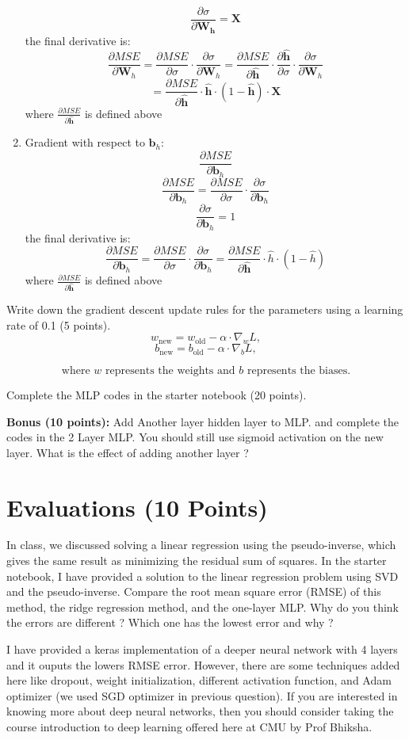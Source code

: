 \documentclass{article}
\begin{document}
\begin{enumerate}
    \[
    \frac{\partial \sigma}{\partial \mathbf{W_h}} = \mathbf{X}
    \]
    the final derivative is:
    \[
    \frac{\partial MSE}{\partial \mathbf{W}_h} = \frac{\partial MSE}{\partial \sigma} \cdot \frac{\partial \sigma}{\partial \mathbf{W}_h} = \frac{\partial MSE}{\partial \mathbf{\hat{h}}} \cdot \frac{\partial \mathbf{\hat{h}}}{\partial \sigma} \cdot \frac{\partial \sigma}{\partial \mathbf{W}_h}
    \]
    \[
    = \frac{\partial MSE}{\partial \mathbf{\hat{h}}} \cdot \mathbf{\hat{h}} \cdot (1 - \mathbf{\hat{h}}) \cdot \mathbf{X}
    \]
    where $\frac{\partial MSE}{\partial \mathbf{\hat{h}}}$ is defined above
    \item Gradient with respect to $\mathbf{b}_h$: $$\frac{\partial MSE}{\partial \mathbf{b}_h}$$
    \[
    \frac{\partial MSE}{\partial \mathbf{b}_h} = \frac{\partial MSE}{\partial \sigma} \cdot \frac{\partial \sigma}{\partial \mathbf{b}_h}
    \]
    \[
    \frac{\partial \sigma}{\partial \mathbf{b}_h} = 1 
    \]
    the final derivative is:
    \[
    \frac{\partial MSE}{\partial \mathbf{b}_h} = \frac{\partial MSE}{\partial \sigma} \cdot \frac{\partial \sigma}{\partial \mathbf{b}_h} = \frac{\partial MSE}{\partial \mathbf{\hat{h}}} \cdot \hat{h} \cdot (1 - \hat{h})
    \]
    where $\frac{\partial MSE}{\partial \mathbf{\hat{h}}}$ is defined above
\end{enumerate}

Write down the gradient descent update rules for the parameters using a learning rate of 0.1 (5 points).
\[
w_{\text{new}} = w_{\text{old}} - \alpha \cdot \nabla_w L,
\]
\[
b_{\text{new}} = b_{\text{old}} - \alpha \cdot \nabla_b L,
\]

\[
\text{where } w \text{ represents the weights and } b \text{ represents the biases.}
\]

Complete the MLP codes in the starter notebook (20 points).

\textbf{Bonus (10 points):} Add Another layer hidden layer to MLP. and complete the codes in the 2 Layer MLP.
You should still use sigmoid activation on the new layer. What is the effect of adding another layer ?

\section{Evaluations (10 Points)}
In class, we discussed solving a linear regression using the pseudo-inverse, which gives the same result as minimizing the residual sum of squares. In the starter notebook, I have provided a solution to the linear regression problem using SVD and the pseudo-inverse. Compare the root mean square error (RMSE) of this method, the ridge regression method, and the one-layer MLP. Why do you think the errors are different ?
Which one has the lowest error and why ?

I have provided a keras implementation of a deeper neural network with 4 layers and it ouputs the lowers
RMSE error. However, there are some techniques added here like dropout, weight initialization, different
activation function, and Adam optimizer (we used SGD optimizer in previous question). If you are interested
in knowing more about deep neural networks, then you should consider taking the course introduction to
deep learning offered here at CMU by Prof Bhiksha.
\end{document}
